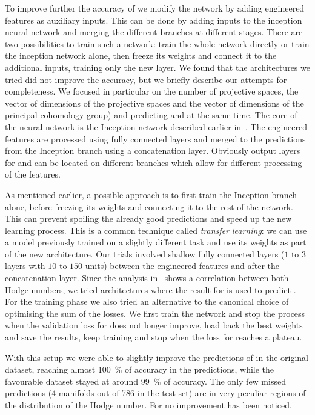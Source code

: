 To improve further the accuracy of  we modify the network by adding engineered features as auxiliary inputs.
This can be done by adding inputs to the inception neural network and merging the different branches at different stages.
There are two possibilities to train such a network: train the whole network directly or train the inception network alone, then freeze its weights and connect it to the additional inputs, training only the new layer.
We found that the architectures we tried did not improve the accuracy, but we briefly describe our attempts for completeness.
We focused in particular on the number of projective spaces, the vector of dimensions of the projective spaces and the vector of dimensions of the principal cohomology group) and predicting  and  at the same time.
The core of the neural network is the Inception network described earlier in~.
The engineered features are processed using fully connected layers and merged to the predictions from the Inception branch using a concatenation layer.
Obviously output layers for  and  can be located on different branches which allow for different processing of the features.

As mentioned earlier, a possible approach is to first train the Inception branch alone, before freezing its weights and connecting it to the rest of the network.
This can prevent spoiling the already good predictions and speed up the new learning process.
This is a common technique called \emph{transfer learning}: we can use a model previously trained on a slightly different task and use its weights as part of the new architecture.
Our trials involved shallow fully connected layers ($1$ to $3$ layers with $10$ to $150$ units) between the engineered features and after the concatenation layer.
Since the \eda analysis in~ shows a correlation between both Hodge numbers, we tried architectures where the result for  is used to predict .
For the training phase we also tried an alternative to the canonical choice of optimising the sum of the losses.
We first train the network and stop the process when the validation loss for  does not longer improve, load back the best weights and save the results, keep training and stop when the loss for  reaches a plateau.

With this setup we were able to slightly improve the predictions of  in the original dataset, reaching almost \SI{100}{\percent} of accuracy in the predictions, while the favourable dataset stayed at around \SI{99}{\percent} of accuracy.
The only few missed predictions (\num{4} manifolds out of \num{786} in the test set) are in very peculiar regions of the distribution of the Hodge number.
For  no improvement has been noticed.



